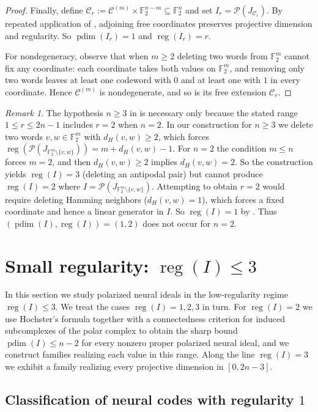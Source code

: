 \documentclass[12pt]{amsart}
\theoremstyle{remark}
\newtheorem{remark}[theorem]{Remark}
\theoremstyle{definition}
\DeclareMathOperator{\reg}{reg}
\DeclareMathOperator{\pd}{pdim}
\newcommand{\F}{\mathbb{F}}
\newcommand{\C}{\mathcal{C}}
\def\P{{\mathcal P}}
\begin{document}
\begin{proof}
Finally, define $\C_r:=\C^{(m)}\times \F_2^{ n-m}\subseteq\F_2^n$ and set $I_r=\P(J_{\C_r})$.
By repeated application of , adjoining free coordinates preserves projective dimension
and regularity. So $\pd(I_r)=1$ and $\reg(I_r)=r$.

For nondegeneracy, observe that when $m\ge 2$ deleting two words from $\F_2^m$ cannot fix any coordinate:
each coordinate takes both values on $\F_2^m$, and removing only two words leaves at least one codeword with
$0$ and at least one with $1$ in every coordinate. Hence $\C^{(m)}$ is nondegenerate, and so is its free
extension $\C_r$.
\end{proof}

\begin{remark}
The hypothesis $n\ge 3$ in  is necessary only because the stated range
$1\le r\le 2n-1$ includes $r=2$ when $n=2$.  In our construction for $n\ge 3$ we delete two words
$v,w\in\F_2^m$ with $d_H(v,w)\ge 2$, which forces $\reg(\P(J_{\F_2^m\setminus\{v,w\}}))=m+d_H(v,w)-1$.
For $n=2$ the condition $m\le n$ forces $m=2$, and then $d_H(v,w)\ge 2$ implies $d_H(v,w)=2$. So the
construction yields $\reg(I)=3$ (deleting an antipodal pair) but cannot produce $\reg (I)=2$ where $I=\P(J_{\F_2^m\setminus\{v,w\}})$.  Attempting to
obtain $r=2$ would require deleting Hamming neighbors ($d_H(v,w)=1$), which forces a fixed coordinate and
hence a linear generator in $I$. So $\reg(I)=1$ by .
Thus $(\pd(I),\reg(I))=(1,2)$ does not occur for $n=2$.
\end{remark}

\section{Small regularity: $\reg  (I) \le 3$}\label{sec:small-reg}

In this section we study polarized neural ideals in the low-regularity regime $\reg(I)\le 3$.
We treat the cases $\reg(I)=1,2,3$ in turn.  For $\reg(I)=2$ we use Hochster’s formula together with a
connectedness criterion for induced subcomplexes of the polar complex to obtain the sharp bound
$\pd(I)\le n-2$ for every nonzero proper polarized neural ideal, and we construct families realizing each value
in this range.  Along the line $\reg(I)=3$ we exhibit a family realizing every projective dimension in
$[0,2n-3]$.



\subsection{Classification of neural codes with regularity $1$}\label{sec:reg1}
\end{document}
